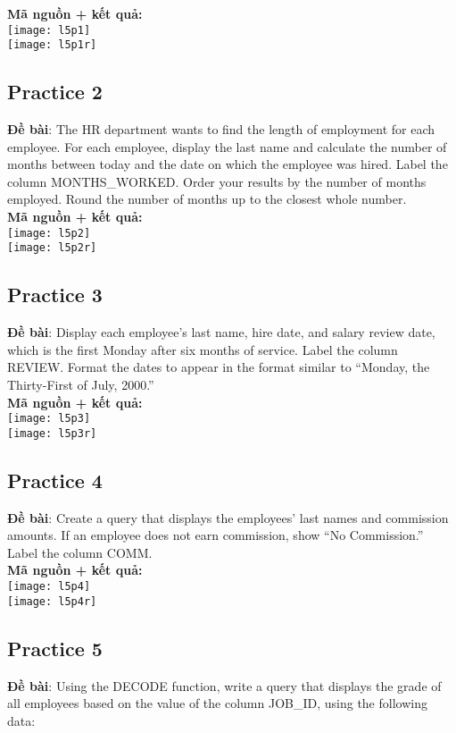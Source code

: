 \documentclass[a4paper]{report}
\begin{document}
\textbf{Mã nguồn + kết quả: }\\
\texttt{[image: l5p1]}\\
\texttt{[image: l5p1r]}

\subsection{Practice 2}
\noindent
\textbf{Đề bài}: The HR department wants to find the length of employment for each employee. For each employee, display the last name and calculate the number of months between today and the date on which the employee was hired. Label the column MONTHS\_WORKED. Order your results by the number of months employed. Round the number of months up to the closest
whole number.\\

\textbf{Mã nguồn + kết quả: }\\
\texttt{[image: l5p2]}\\
\texttt{[image: l5p2r]}

\subsection{Practice 3}
\noindent
\textbf{Đề bài}: Display each employee’s last name, hire date, and salary review date, which is the first Monday after six months of service. Label the column REVIEW. Format the dates to appear in the format similar to “Monday, the Thirty-First of July, 2000.”\\

\textbf{Mã nguồn + kết quả: }\\
\texttt{[image: l5p3]}\\
\texttt{[image: l5p3r]}

\subsection{Practice 4}
\noindent
\textbf{Đề bài}: Create a query that displays the employees’ last names and commission amounts. If
an employee does not earn commission, show “No Commission.” Label the column COMM.\\

\textbf{Mã nguồn + kết quả: }\\
\texttt{[image: l5p4]}\\
\texttt{[image: l5p4r]}

\subsection{Practice 5}
\noindent
\textbf{Đề bài}: Using the DECODE function, write a query that displays the grade of all employees based on the value of the column JOB\_ID, using the following data:\\
\end{document}
